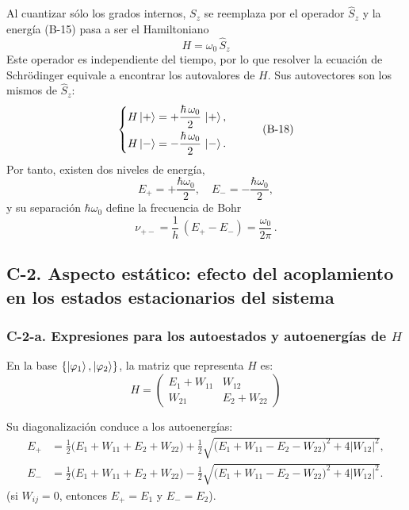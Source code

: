\documentclass[a4paper,11pt]{article}
\begin{document}
Al cuantizar sólo los grados internos, $S_{z}$ se reemplaza por el operador $\hat S_{z}$ y la energía (B-15) pasa a ser el Hamiltoniano
\begin{equation}
H=\omega_{0}\,\hat S_{z}
\tag{B-17}
\end{equation}
Este operador es independiente del tiempo, por lo que resolver la ecuación de Schrödinger equivale a encontrar los autovalores de $H$. Sus autovectores son los mismos de $\hat S_{z}$:
\begin{equation}
\begin{cases}
H\ket{+}=+\dfrac{\hbar\,\omega_{0}}{2}\,\ket{+},\\[6pt]
H\ket{-}=-\dfrac{\hbar\,\omega_{0}}{2}\,\ket{-}.
\end{cases}
\tag{B-18}
\end{equation}
Por tanto, existen dos niveles de energía,
\[
E_{+}=+\frac{\hbar\omega_{0}}{2},
\quad
E_{-}=-\frac{\hbar\omega_{0}}{2},
\]
y su separación $\hbar\omega_{0}$ define la frecuencia de Bohr
\begin{equation}
\nu_{+-}
=\frac{1}{h}\,(E_{+}-E_{-})
=\frac{\omega_{0}}{2\pi}\,.
\tag{B-19}
\end{equation}

\subsection*{C-2. Aspecto estático: efecto del acoplamiento en los estados estacionarios del sistema}

\subsubsection*{C-2-a. Expresiones para los autoestados y autoenergías de \(H\)}

En la base \(\{\ket{\varphi_1},\ket{\varphi_2}\}\), la matriz que representa \(H\) es:
\begin{equation}
H = \begin{pmatrix}
E_1 + W_{11} & W_{12} \\
W_{21}       & E_2 + W_{22}
\end{pmatrix}
\tag{C-7}
\end{equation}

Su diagonalización conduce a los autoenergías:
\begin{equation}
\begin{aligned}
E_+ &= \tfrac12\bigl(E_1 + W_{11} + E_2 + W_{22}\bigr)
       + \tfrac12\sqrt{\bigl(E_1 + W_{11} - E_2 - W_{22}\bigr)^2 + 4|W_{12}|^2},\\
E_- &= \tfrac12\bigl(E_1 + W_{11} + E_2 + W_{22}\bigr)
       - \tfrac12\sqrt{\bigl(E_1 + W_{11} - E_2 - W_{22}\bigr)^2 + 4|W_{12}|^2}.
\end{aligned}
\tag{C-8}
\end{equation}
(si \(W_{ij}=0\), entonces \(E_+=E_1\) y \(E_-=E_2\)).  
\end{document}

